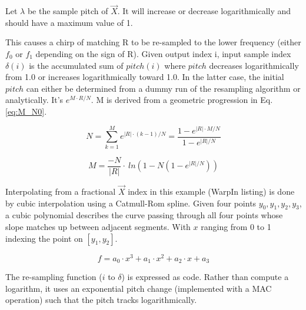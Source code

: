 Let $\lambda$ be the sample pitch of $\vec{X}$.
It will increase or decrease logarithmically and should have a maximum value of 1.

This causes a chirp of matching R to be re-sampled to the lower frequency
(either $f_0$ or $f_1$ depending on the sign of R).
Given output index i, input sample index $\delta(i)$ is the accumulated sum of
$pitch(i)$ where $pitch$ decreases logarithmically from 1.0
or increases logarithmically toward 1.0.
In the latter case, the initial $pitch$ can either be determined from a dummy
run of the resampling algorithm or analytically.
It's $e^{M \cdot R/N}$. 
M is derived from a geometric progression in Eq. \ref{eq:M_N0}.

\begin{equation}  \label{eq:M_N0}
N = \sum_{k=1}^{M} e^{|R| \cdot (k-1)/N} = \frac{1 - e^{|R| \cdot M/N}}{1 - e^{|R|/N}}
\end{equation}

\begin{equation}  \label{eq:M_N}
M = \frac{-N}{|R|} \cdot\ ln\left( 1 - N(1-e^{|R|/N}) \right)
\end{equation}

Interpolating from a fractional $\vec{X}$ index in this example (WarpIn listing)
is done by cubic interpolation using a Catmull-Rom spline.
Given four points $y_0, y_1, y_2, y_3$, a cubic polynomial describes the curve
passing through all four points whose slope matches up between adjacent segments.
With $x$ ranging from 0 to 1 indexing the point on $[y_1, y_2]$.

\begin{equation}  \label{eq:cubic}
f = a_0 \cdot x^3 + a_1 \cdot x^2 + a_2 \cdot x + a_3
\end{equation}

The re-sampling function ($i$ to $\delta$) is expressed as code.
Rather than compute a logarithm, it uses an exponential pitch change 
(implemented with a MAC operation) such that the pitch tracks logarithmically.

